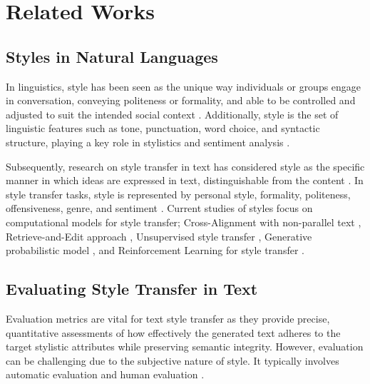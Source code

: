 \section{Related Works}
\label{sec:related_works}

\subsection{Styles in Natural Languages}
In linguistics, style has been seen as the unique way individuals or groups engage in conversation, conveying politeness or formality, and able to be controlled and adjusted to suit the intended social context \cite{Labov1997}. Additionally, style is the set of linguistic features such as tone, punctuation, word choice, and syntactic structure, playing a key role in stylistics and sentiment analysis \cite{pang}. 

Subsequently, research on style transfer in text has considered style as the specific manner in which ideas are expressed in text, distinguishable from the content \cite{shen}. In style transfer tasks, style is represented by personal style, formality, politeness, offensiveness, genre, and sentiment \cite{Toshevska_2022}. Current studies of styles focus on computational models for style transfer; Cross-Alignment with non-parallel text \cite{shen}, Retrieve-and-Edit approach \cite{li-etal-2018-delete}, Unsupervised style transfer \cite{prabhumoye-etal-2018-style}, Generative probabilistic model \cite{he2020probabilisticformulationunsupervisedtext}, and Reinforcement Learning for style transfer \cite{gong2019reinforcementlearningbasedtext}.

\subsection{Evaluating Style Transfer in Text}
Evaluation metrics are vital for text style transfer as they provide precise, quantitative assessments of how effectively the generated text adheres to the target stylistic attributes while preserving semantic integrity. However, evaluation can be challenging due to the subjective nature of style. It typically involves automatic evaluation and human evaluation \cite{jin-etal-2022-deep}.


